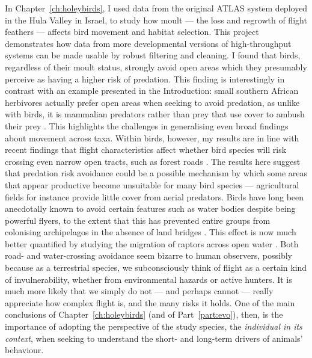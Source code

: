 In Chapter~\ref{ch:holeybirds}, I used data from the original ATLAS system deployed in the Hula Valley in Israel, to study how moult --- the loss and regrowth of flight feathers --- affects bird movement and habitat selection.
This project demonstrates how data from more developmental versions of high-throughput systems can be made usable by robust filtering and cleaning.
I found that birds, regardless of their moult status, strongly avoid open areas which they presumably perceive as having a higher risk of predation.
This finding is interestingly in contrast with an example presented in the Introduction: small southern African herbivores actually prefer open areas when seeking to avoid predation, as unlike with birds, it is mammalian predators rather than prey that use cover to ambush their prey \parencite[][]{leroux2018}.
This highlights the challenges in generalising even broad findings about movement across taxa.
Within birds, however, my results are in line with recent findings that flight characteristics affect whether bird species will risk crossing even narrow open tracts, such as forest roads \citep{claramunt2022}.
The results here suggest that predation risk avoidance could be a possible mechanism by which some areas that appear productive become unsuitable for many bird species --- agricultural fields for instance provide little cover from aerial predators.
Birds have long been anecdotally known to avoid certain features such as water bodies despite being powerful flyers, to the extent that this has prevented entire groups from colonising archipelagos in the absence of land bridges \citep{diamond1981}.
This effect is now much better quantified by studying the migration of raptors across open water \citep{nourani2020}.
Both road- and water-crossing avoidance seem bizarre to human observers, possibly because as a terrestrial species, we subconsciously think of flight as a certain kind of invulnerability, whether from environmental hazards or active hunters.
It is much more likely that we simply do not --- and perhaps cannot --- really appreciate how complex flight is, and the many risks it holds.
One of the main conclusions of Chapter~\ref{ch:holeybirds} (and of Part~\ref{part:evo}), then, is the importance of adopting the perspective of the study species, the \textit{individual in its context}, when seeking to understand the short- and long-term drivers of animals' behaviour.

